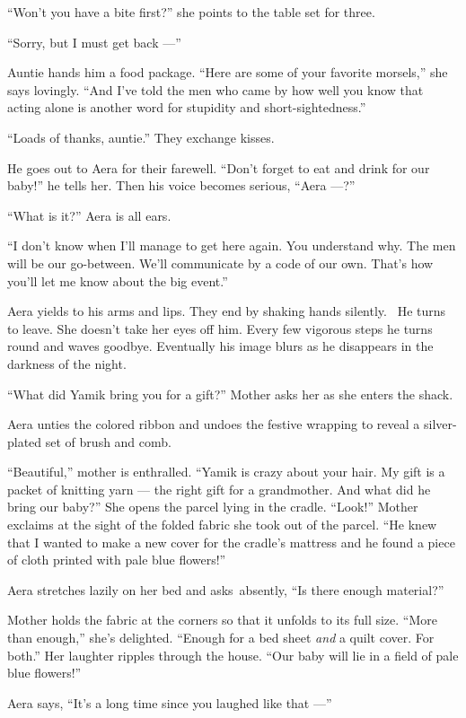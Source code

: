\documentclass[twoside,11pt]{book}
\begin{document}
``Won't you have a bite first?'' she points to the table set for three.

``Sorry, but I must get back ---''

Auntie hands him a food package. ``Here are some of your favorite morsels,'' she says
lovingly. ``And I've told the men who came by how well you know that acting alone is another word for
stupidity and short-sightedness.''

``Loads of thanks, auntie.'' They exchange kisses.

He goes out{ }to Aera for their farewell. ``Don't forget to eat and drink for our
baby!'' he tells her. Then his voice becomes serious, ``Aera ---?''

``What is it?'' Aera is all ears.

``I don't know when I'll manage to get here again. You understand why. The men will be our go-between.
We'll communicate by a code of our own. That's how you'll let me know about the big event.''

Aera yields to his arms and lips. They end by shaking hands silently. ~He turns to leave. She doesn't take her eyes off
him. Every few vigorous steps he turns round and waves goodbye. Eventually his image blurs as he disappears in the
darkness of the night.

``What did Yamik bring you for a gift?'' Mother asks her as she enters the shack.

Aera unties the colored ribbon and undoes the festive wrapping to reveal a silver-plated set of brush and comb.

``Beautiful,'' mother is enthralled. ``Yamik is crazy about your hair. My gift is
a packet of knitting yarn --- the right gift for a grandmother. And what did he bring our baby?'' She opens
the parcel lying in the cradle. ``Look!'' Mother exclaims at the sight of the folded fabric
she took out of the parcel. ``He knew that I wanted to make a new cover for the cradle's mattress and he
found a piece of cloth printed with pale blue flowers!''

Aera stretches lazily on her bed and asks~absently, ``Is there enough material?''

Mother holds the fabric at the corners so that it unfolds to its full size. ``More than
enough,'' she's delighted. ``Enough for a bed sheet \textit{and }a quilt cover.  For
both.'' Her laughter ripples through the house. ``Our baby will lie in a field of pale blue
flowers!''

Aera says, ``It's a long time since you laughed like that ---''
\end{document}
